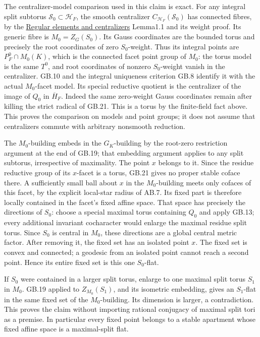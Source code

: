 \documentclass[
  11pt,
]{article}
\begin{document}
The centralizer-model comparison used in this claim is exact. For any
integral split subtorus \(\mathcal S_0\subset\mathcal H_F\), the smooth
centralizer \(C_{\mathcal H_F}(\mathcal S_0)\) has connected fibres, by
the \href{../AG-RG/AG-RG-02.html}{Regular elements and centralizers}
Lemma1.1 and its weight proof. Its generic fibre is \(M_0=Z_G(S_0)\).
Its Gauss coordinates are the bounded torus and precisely the root
coordinates of zero \(S_0\)-weight. Thus its integral points are
\(P_F^0\cap M_0(K)\), which is the connected facet point group of
\(M_0\): the torus model is the same \(T^0\), and root coordinates of
nonzero \(S_0\)-weight vanish in the centralizer. GB.10 and the integral
uniqueness criterion GB.8 identify it with the actual \(M_0\)-facet
model. Its special reductive quotient is the centralizer of the image of
\(Q_0\) in \(\overline H_F\). Indeed the same zero-weight Gauss
coordinates remain after killing the strict radical of GB.21. This is a
torus by the finite-field fact above. This proves the comparison on
models and point groups; it does not assume that centralizers commute
with arbitrary nonsmooth reduction.

The \(M_0\)-building embeds in the \(G_K\)-building by the root-zero
restriction argument at the end of GB.19; that embedding argument
applies to any split subtorus, irrespective of maximality. The point
\(x\) belongs to it. Since the residue reductive group of its
\(x\)-facet is a torus, GB.21 gives no proper stable coface there. A
sufficiently small ball about \(x\) in the \(M_0\)-building meets only
cofaces of this facet, by the explicit local-star radius of AB.7. Its
fixed part is therefore locally contained in the facet's fixed affine
space. That space has precisely the directions of \(S_0\): choose a
special maximal torus containing \(Q_0\) and apply GB.13; every
additional invariant cocharacter would enlarge the maximal residue split
torus. Since \(S_0\) is central in \(M_0\), these directions are a
global central metric factor. After removing it, the fixed set has an
isolated point \(x\). The fixed set is convex and connected; a geodesic
from an isolated point cannot reach a second point. Hence its entire
fixed set is this one \(S_0\)-flat.

If \(S_0\) were contained in a larger split torus, enlarge to one
maximal split torus \(S_1\) in \(M_0\). GB.19 applied to
\(Z_{M_0}(S_1)\), and its isometric embedding, gives an \(S_1\)-flat in
the same fixed set of the \(M_0\)-building. Its dimension is larger, a
contradiction. This proves the claim without importing rational
conjugacy of maximal split tori as a premise. In particular every fixed
point belongs to a stable apartment whose fixed affine space is a
maximal-split flat.
\end{document}
